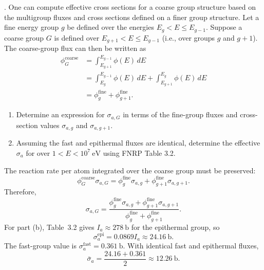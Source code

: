 
. One can compute effective cross sections for a
coarse group structure based on the multigroup fluxes and cross sections
defined on a finer group structure. Let a fine energy group $g$ be defined over
the energies $E_g<E\le E_{g-1}$. Suppose a coarse group $G$ is defined over
$E_{g+1}<E\le E_{g-1}$ (i.e., over groups $g$ and $g+1$). The coarse-group
flux can then be written as
\[
\begin{aligned}
 \phi_G^{\mathrm{coarse}}
 &=\int_{E_{g+1}}^{E_{g-1}}\phi(E)\,dE\\
 &=\int_{E_g}^{E_{g-1}}\phi(E)\,dE
  +\int_{E_{g+1}}^{E_g}\phi(E)\,dE\\
 &=\phi_g^{\mathrm{fine}}+\phi_{g+1}^{\mathrm{fine}}.
\end{aligned}
\]
\begin{enumerate}[label=(\alph*)]
\item Determine an expression for $\sigma_{a,G}$ in terms of the fine-group
      fluxes and cross-section values $\sigma_{a,g}$ and
      $\sigma_{a,g+1}$.
\item Assuming the fast and epithermal fluxes are identical, determine the
      effective $\sigma_a$ for  over
      $1<E<10^7~\mathrm{eV}$ using FNRP Table 3.2.
\end{enumerate}

\begin{adaptedsolution}
The reaction rate per atom integrated over the coarse group must be preserved:
\[
 \phi_G^{\mathrm{coarse}}\sigma_{a,G}
 =\phi_g^{\mathrm{fine}}\sigma_{a,g}
 +\phi_{g+1}^{\mathrm{fine}}\sigma_{a,g+1}.
\]
Therefore,
\[
 \boxed{\sigma_{a,G}
 =\frac{\phi_g^{\mathrm{fine}}\sigma_{a,g}
       +\phi_{g+1}^{\mathrm{fine}}\sigma_{a,g+1}}
      {\phi_g^{\mathrm{fine}}+\phi_{g+1}^{\mathrm{fine}}}}.
\]
For part (b), Table~3.2 gives $I_a\approx278~\mathrm b$ for the epithermal
group, so
\[
 \sigma_a^{\mathrm{epi}}
 =0.0869 I_a
 \approx24.16~\mathrm b.
\]
The fast-group value is $\sigma_a^{\mathrm{fast}}=0.361~\mathrm b$.  With
identical fast and epithermal fluxes,
\[
 \boxed{\bar{\sigma}_a
 =\frac{24.16+0.361}{2}
 \approx12.26~\mathrm b}.
\]
\end{adaptedsolution}

\newpage

